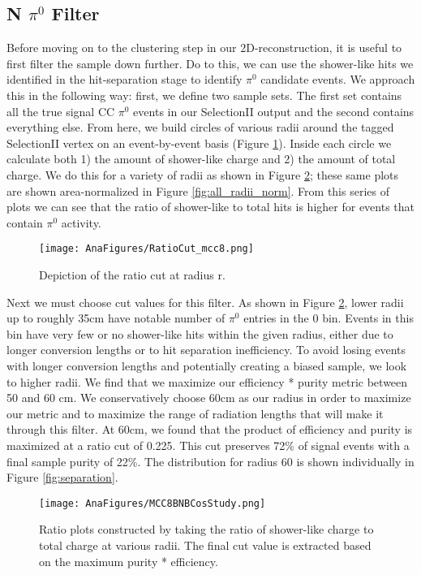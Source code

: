 \documentclass[12pt]{article}
\begin{document}
\subsection{N $\pi^0$ Filter}
Before moving on to the clustering step in our 2D-reconstruction, it is useful to first filter the sample down further.  Do to this, we can use the shower-like hits we identified in the hit-separation stage to identify $\pi^0$ candidate events. We approach this in the following way: first, we define two sample sets. The first set contains all the true signal CC $\pi^0$ events in our SelectionII output and the second contains everything else.  From here, we build circles of various radii around the tagged SelectionII vertex on an event-by-event basis (Figure \ref{fig:circle}). Inside each circle we calculate both 1) the amount of shower-like charge and 2) the amount of total charge. We do this for a variety of radii as shown in Figure \ref{fig:all_radii}; these same plots are shown area-normalized in Figure \ref{fig:all_radii_norm}.  From this series of plots we can see that the ratio of shower-like to total hits is higher for events that contain $\pi^0$ activity.  

\begin{figure}[h!]
\centering
\texttt{[image: AnaFigures/RatioCut\_mcc8.png]}
\caption{ Depiction of the ratio cut at radius r.  }
\label{fig:circle}
\end{figure}

\par Next we must choose cut values for this filter. As shown in Figure \ref{fig:all_radii}, lower radii up to roughly 35cm have notable number of $\pi^0$ entries in the 0 bin. Events in this bin have very few or no shower-like hits within the given radius, either due to longer conversion lengths or to hit separation inefficiency. To avoid losing events with longer conversion lengths and potentially creating a biased sample, we look to higher radii. We find that we maximize our efficiency * purity metric between 50 and 60 cm. We conservatively choose 60cm as our radius in order to maximize our metric and to maximize the range of radiation lengths that will make it through this filter.  At 60cm, we found that the product of efficiency and purity is maximized at a ratio cut of 0.225. This cut preserves 72\% of signal events with a final sample purity of 22\%. The distribution for radius 60 is shown individually in Figure \ref{fig:separation}.

\begin{figure}[h!]
\texttt{[image: AnaFigures/MCC8BNBCosStudy.png]}
\caption{Ratio plots constructed by taking the ratio of shower-like charge to total charge at various radii. The final cut value is extracted based on the maximum purity * efficiency. }
\label{fig:all_radii}
\end{figure}
\end{document}
